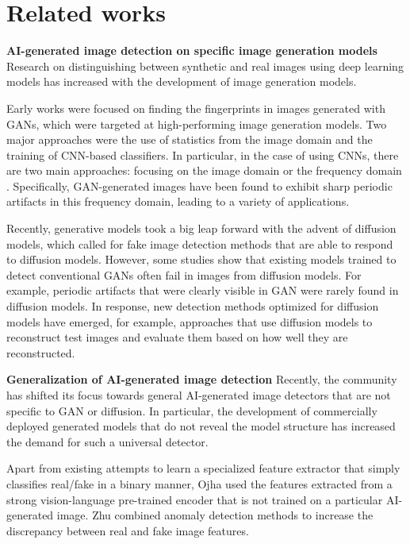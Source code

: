 \section{Related works}
\label{sec:related-works}

\textbf{AI-generated image detection on specific image generation models} 
Research on distinguishing between synthetic and real images using deep learning models has increased with the development of image generation models. 

Early works were focused on finding the fingerprints in images generated with GANs, which were targeted at high-performing image generation models.
Two major approaches were the use of statistics from the image domain \cite{mccloskey2018detecting, nataraj2019detecting} and the training of CNN-based classifiers.
In particular, in the case of using CNNs, there are two main approaches: focusing on the image domain \cite{mo2018fake, yu2019attributing, tariq2019gan} or the frequency domain \cite{marra2019gans, valle2018tequilagan, Frank}.
Specifically, GAN-generated images have been found to exhibit sharp periodic artifacts in this frequency domain, leading to a variety of applications\cite{ricker2024detectiondiffusionmodeldeepfakes, corvi2023detection, Frank}.

Recently, generative models took a big leap forward with the advent of diffusion models, which called for fake image detection methods that are able to respond to diffusion models.
However, some studies show that existing models trained to detect conventional GANs often fail in images from diffusion models.
For example, periodic artifacts that were clearly visible in GAN were rarely found in diffusion models\cite{ricker2024detectiondiffusionmodeldeepfakes, corvi2023detection}. 
In response, new detection methods optimized for diffusion models have emerged, for example, approaches that use diffusion models to reconstruct test images and evaluate them based on how well they are reconstructed\cite{Wang_2023_ICCV, luo2024lare, zhang2023diffusion}.

\textbf{Generalization of AI-generated image detection}
Recently, the community has shifted its focus towards general AI-generated image detectors that are not specific to GAN or diffusion. In particular, the development of commercially deployed generated models that do not reveal the model structure has increased the demand for such a universal detector.

Apart from existing attempts to learn a specialized feature extractor that simply classifies real/fake in a binary manner, Ojha \etal\cite{ojha2023towards} used the features extracted from a strong vision-language pre-trained encoder that is not trained on a particular AI-generated image. Zhu \etal\cite{zhu2023gendet} combined anomaly detection methods to increase the discrepancy between real and fake image features. 

